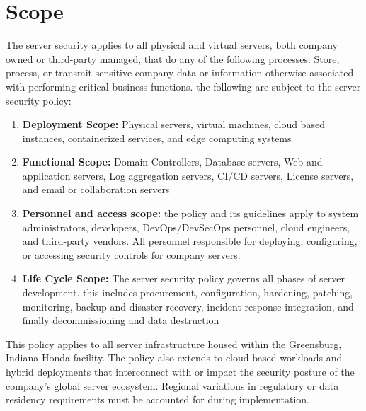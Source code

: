 \section{Scope}
The server security applies to all physical and virtual servers, both company owned or third-party managed, that do any of the following processes: Store, process, or transmit sensitive company data or information otherwise associated with performing critical business functions. the following are subject to the server security policy:
\begin{enumerate}
    \item \textbf{Deployment Scope:} Physical servers, virtual machines, cloud based instances, containerized services, and edge computing systems
    \item \textbf{Functional Scope:} Domain Controllers, Database servers, Web and application servers, Log aggregation servers, CI/CD servers, License servers, and email or collaboration servers
    \item \textbf{Personnel and access scope:} the policy and its guidelines apply to system administrators, developers, DevOps/DevSecOps personnel, cloud engineers, and third-party vendors. All personnel responsible for deploying, configuring, or accessing security controls for company servers.
    \item \textbf{Life Cycle Scope:}
    The server security policy governs all phases of server development. this includes procurement, configuration, hardening, patching, monitoring, backup and disaster recovery, incident response integration, and finally decommissioning and data destruction
\end{enumerate}
This policy applies to all server infrastructure housed within the Greensburg, Indiana Honda facility. The policy also extends to cloud-based workloads and hybrid deployments that interconnect with or impact the security posture of the company’s global server ecosystem. Regional variations in regulatory or data residency requirements must be accounted for during implementation.
